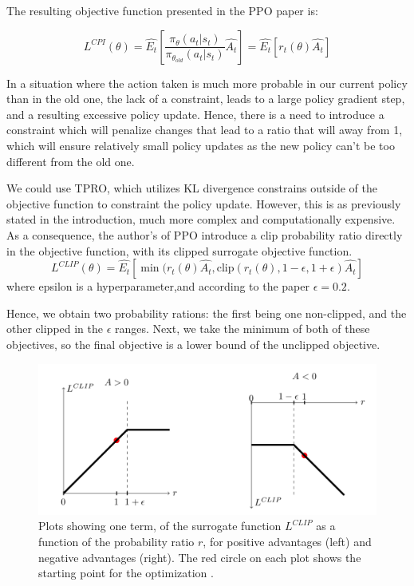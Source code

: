 \documentclass[12pt,a4paper]{article}
\begin{document}
The resulting objective function presented in the PPO paper is:

\begin{equation}
L^{CPI}(\theta) =\hat{E_{t}} [\frac{\pi_{\theta}(a_t|s_t)}{ \pi_{\theta_{old}} (a_t|s_t) }  \hat{{A_t}}  ]  = \hat{E_{t}}[r_t (\theta)  \hat{{A_t}} ]
\end{equation}

In a situation where the action taken is much more probable in our current policy than in the old one, the lack of a constraint, leads to a large policy gradient step, and a resulting excessive policy update. Hence, there is a need to introduce a constraint which will penalize changes that lead to a ratio that will away from 1, which will ensure relatively small policy updates as the new policy can't be too different from the old one.

We could use TPRO, which utilizes KL divergence constrains outside of the objective function to constraint the policy update. However, this is as previously stated in the introduction, much more complex and computationally expensive.
As a consequence, the author's of PPO introduce a clip probability ratio directly in the objective function, with its clipped surrogate objective function.
\begin{equation}
L^{CLIP}(\theta) =\hat{E_{t}} [\min(r_t (\theta) \hat{{A_t}}  , \mbox{clip}(r_t (\theta), 1 - \epsilon, 1 + \epsilon) \hat{{A_t}} ]
\end{equation}
where epsilon is a hyperparameter,and according to the paper $\epsilon = 0.2$.

Hence, we obtain two probability rations: the first being one non-clipped, and the other clipped in the $\epsilon$ ranges. Next, we take the minimum of both of these objectives, so the final objective is a lower bound of the unclipped objective. 


\begin{figure}[H]
\begin{center}
\includegraphics[width=0.7\columnwidth, angle = 0]{img/clipped.png}
\end{center}
\caption{Plots showing one term, of the surrogate function $L^{CLIP}$ as a function of the probability ratio $r$, for positive advantages (left) and negative advantages  (right). The red circle on each plot shows the starting point for the optimization \cite{PPO}.}
\label{img:clip}
\end{figure}
\end{document}

